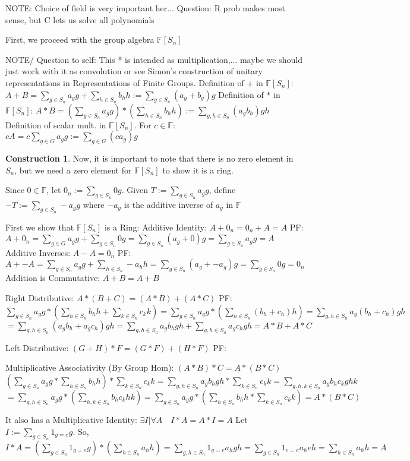 \documentclass{article}
\theoremstyle{definition}
\newtheorem{construction}{Construction}
\begin{document}
NOTE: Choice of field is very important her...
Question: R prob makes most sense, but C lets us solve all polynomials

First, we proceed with the group algebra $\mathbb{F}[S_n]$

NOTE/ Question to self: This * is intended as multiplication,... maybe we should just work with it as convolution or see Simon's construction of unitary representations in Representations of Finite Groups.
Definition of + in $\mathbb{F}[S_n]$: $A + B =\sum_{g\in S_n} a_g g + \sum_{h \in S_n} b_h h :=\sum_{g \in S_n} (a_g + b_g) g $
Definition of $*$ in $\mathbb{F}[S_n]$: $A * B = (\sum_{g\in S_n} a_g g) * (\sum_{h \in S_n} b_h h) :=\sum_{g,h \in S_n} (a_g b_h) gh $
Definition of scalar mult. in $\mathbb{F}[S_n]$. For $ c \in \mathbb{F}$: $cA = c\sum_{g\in G} a_g g := \sum_{g\in G} (c a_g) g $  

\begin{construction}
Now, it is important to note that there is no zero element in $S_n$, but we need a zero element for $\mathbb{F}[S_n]$ to show it is a ring.

Since $0 \in \mathbb{F}$, let $0_n := \sum_{g\in S_n}0g$.
Given $ T := \sum_{g \in S_n} a_g g $, define $ -T := \sum_{g \in S_n} -a_g g $ where $-a_g$ is the additive inverse of $a_g$ in $\mathbb{F}$

First we show that $\mathbb{F}[S_n]$ is a Ring:
Additive Identity: $ A + 0_n = 0_n + A = A$
PF: $A + 0_n = \sum_{g \in G} a_g g + \sum_{g\in S_n} 0g = \sum_{g \in S_n} (a_g + 0)g = \sum_{g \in S_n} a_g g = A  $
Additive Inverses: $ A - A = 0_n $ 
PF: $A + -A = \sum_{g\in S_n} a_g g + \sum_{h \in S_n} -a_h h = \sum_{g \in S_n} (a_g + -a_g) g = \sum_{g \in S_n} 0g = 0_n $
Addition is Commutative: $A+ B = A + B$

Right Distributive: $ A * (B +C) = (A*B) + (A*C)$
PF: $\sum_{g\in S_n} a_g g * ( \sum_{h \in S_n} b_h h + \sum_{k \in S_n} c_k k) =\sum_{g\in S_n} a_g g * (\sum_{h \in S_n} (b_h + c_h) h ) = \sum_{g,h \in S_n} a_g(b_h + c_h) gh$ $= \sum_{g,h \in S_n} (a_g b_h + a_g c_h) gh = \sum_{g,h \in S_n} a_g b_h gh + \sum_{g,h \in S_n} a_g c_h gh
= A*B + A*C$

Left Distributive: $ (G+H)*F = (G*F) + (H*F)$
PF: 

Multiplicative Associativity (By Group Hom): $(A*B) *C = A* (B*C)$
$ (\sum_{g\in S_n} a_g g * \sum_{h\in S_n} b_h h) * \sum_{k\in S_n} c_k k   = \sum_{g,h\in S_n} a_g b_h gh * \sum_{k\in S_n} c_k k = \sum_{g,h,k\in S_n} a_g b_h c_k ghk $
$= \sum_{g,h\in S_n} a_g g * (\sum_{h,k\in S_n} b_h c_k hk) = \sum_{g\in S_n} a_g g * (\sum_{h\in S_n} b_h h * \sum_{k\in S_n} c_k k) =  A *(B*C)     $

It also has a Multiplicative Identity: $ \exists I | \forall A \quad  I*A = A*I = A $
Let $I := \sum_{g\in S_n} 1_{g=e} g $. So, $I * A = (\sum_{g\in S_n} 1_{g=e} g) * (\sum_{h\in S_n} a_h h) = \sum_{g,h\in S_n} 1_{g=e} a_h gh = \sum_{g\in S_n} 1_{e=e}a_h eh = \sum_{h\in S_n} a_h h = A$
\end{construction}
\end{document}
